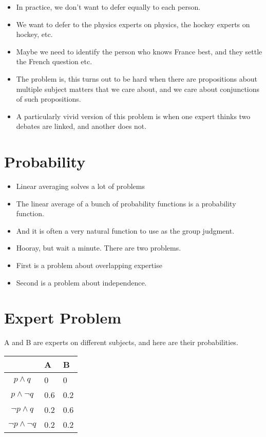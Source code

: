 \documentclass[11pt,]{article}
\providecommand{\tightlist}{%
  \setlength{\itemsep}{0pt}\setlength{\parskip}{0pt}}
\begin{document}
\begin{itemize}
\tightlist
\item
  In practice, we don't want to defer equally to each person.
\item
  We want to defer to the physics experts on physics, the hockey experts
  on hockey, etc.
\item
  Maybe we need to identify the person who knows France best, and they
  settle the French question etc.
\item
  The problem is, this turns out to be hard when there are propositions
  about multiple subject matters that we care about, and we care about
  conjunctions of such propositions.
\item
  A particularly vivid version of this problem is when one expert thinks
  two debates are linked, and another does not.
\end{itemize}

\hypertarget{probability}{%
\section{Probability}\label{probability}}

\begin{itemize}
\tightlist
\item
  Linear averaging solves a lot of problems
\item
  The linear average of a bunch of probability functions is a
  probability function.
\item
  And it is often a very natural function to use as the group judgment.
\item
  Hooray, but wait a minute. There are two problems.
\item
  First is a problem about overlapping expertise
\item
  Second is a problem about independence.
\end{itemize}

\hypertarget{expert-problem}{%
\section{Expert Problem}\label{expert-problem}}

A and B are experts on different subjects, and here are their
probabilities.

\begin{longtable}[]{@{}cll@{}}
\toprule
& A & B\tabularnewline
\midrule
\endhead
\(p \wedge q\) & 0 & 0\tabularnewline
\(p \wedge \neg q\) & 0.6 & 0.2\tabularnewline
\(\neg p \wedge q\) & 0.2 & 0.6\tabularnewline
\(\neg p \wedge \neg q\) & 0.2 & 0.2\tabularnewline
\bottomrule
\end{longtable}
\end{document}
